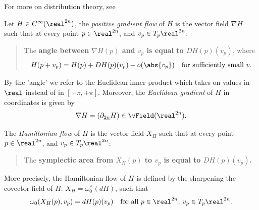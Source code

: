 \documentclass[../main-v2-manifolds.tex]{subfiles}
\begin{document}
For more on distribution theory, see \cite{Folland2013Real,Yosida2012,}


\begin{definition}\label{rmk:gradient flow}
Let $H\in C^\infty(\realtn)$, the \emph{positive gradient flow} of $H$ is the vector field $\nabla H$ such that at every point $p\in \realtn$, and $v_p\in T_p \realtn$:
\begin{quote}
    The \textbf{angle between $\nabla{H}(p)$ and $v_p$ is equal to $DH(p)(v_p)$}, where
    \begin{equation}
    H(p+v_p) = H(p) + DH(p)(v_p) + o(\abs{v_p})\quad\text{for sufficiently small }v.
    \label{eq:Frechet Derivative as best possible linear approximation}
\end{equation}
\end{quote}
By the 'angle' we refer to the Euclidean inner product which takes on values in $\real$ instead of in $[-\pi, +\pi]$. Moreover, the \emph{Euclidean gradient} of $H$ in coordinates is given by
\[\nabla H = (\partial_{\underline{2n}}H)\in\vField(\realtn).\]
\end{definition}
\begin{definition}
    The \emph{Hamiltonian flow} of $H$ is the vector field $X_H$ such that at every point $p\in \realtn$, and $v_p\in T_p\realtn$:
    \begin{quote}
        The \textbf{symplectic area from $X_H(p)$ to $v_p$ is equal to $DH(p)(v_p)$.}
    \end{quote}
    More precisely, the Hamiltonian flow of $H$ is defined by the sharpening the covector field of $H$:  $X_H = \omega_0^{\wedge}(dH)$, such that
    \begin{equation}
        \omega_0(X_H(p), v_p) = dH(p)(v_p)\quad\text{for all }p\in \realtn,\: v_p\in T_p\realtn.
        \label{eq:hamiltonian flow definition symplectic pairing}
    \end{equation}
\end{definition}
\end{document}
